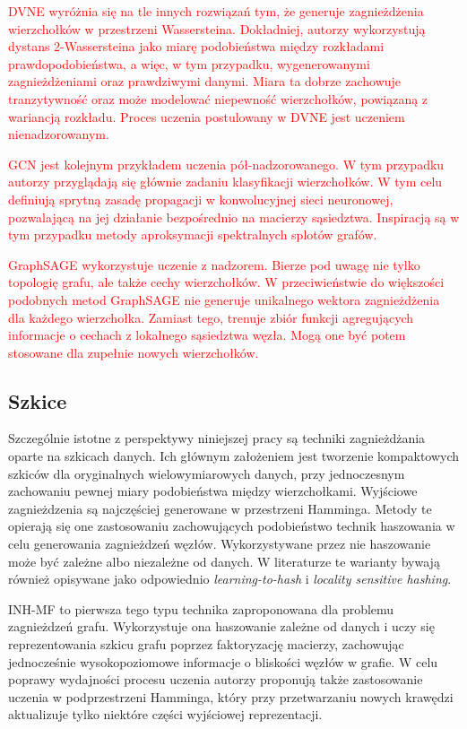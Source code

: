         \textcolor{red}{
        DVNE\cite{Zhu_Cui_Wang_Zhu_2018} wyróżnia się na tle innych rozwiązań tym, że generuje zagnieżdżenia wierzchołków w przestrzeni Wassersteina. Dokładniej, autorzy wykorzystują dystans 2-Wassersteina jako miarę podobieństwa między rozkładami prawdopodobieństwa, a więc, w tym przypadku, wygenerowanymi zagnieżdżeniami oraz prawdziwymi danymi. Miara ta dobrze zachowuje tranzytywność oraz może modelować niepewność wierzchołków, powiązaną z wariancją rozkładu. Proces uczenia postulowany w DVNE jest uczeniem nienadzorowanym.}
        
        \textcolor{red}{
        GCN\cite{DBLP:journals/corr/KipfW16} jest kolejnym przykładem uczenia pół-nadzorowanego. W tym przypadku autorzy przyglądają się głównie zadaniu klasyfikacji wierzchołków. W tym celu definiują sprytną zasadę propagacji w konwolucyjnej sieci neuronowej, pozwalającą na jej działanie bezpośrednio na macierzy sąsiedztwa. Inspiracją są w tym przypadku metody aproksymacji spektralnych splotów grafów.}
        
        \textcolor{red}{
        GraphSAGE\cite{DBLP:journals/corr/HamiltonYL17} wykorzystuje uczenie z nadzorem. Bierze pod uwagę nie tylko topologię grafu, ale także cechy wierzchołków. W przeciwieństwie do większości podobnych metod GraphSAGE nie generuje unikalnego wektora zagnieżdżenia dla każdego wierzchołka. Zamiast tego, trenuje zbiór funkcji agregujących informacje o cechach z lokalnego sąsiedztwa węzła. Mogą one być potem stosowane dla zupełnie nowych wierzchołków.}
        
    \subsection{Szkice}
        Szczególnie istotne z perspektywy niniejszej pracy są techniki zagnieżdżania oparte na szkicach danych. Ich głównym założeniem jest tworzenie kompaktowych szkiców dla oryginalnych wielowymiarowych danych, przy jednoczesnym zachowaniu pewnej miary podobieństwa między wierzchołkami. Wyjściowe zagnieżdzenia są najczęściej generowane w przestrzeni Hamminga. Metody te opierają się one zastosowaniu zachowujących podobieństwo technik haszowania w celu generowania zagnieżdzeń węzłów. Wykorzystywane przez nie haszowanie może być zależne albo niezależne od danych. W literaturze te warianty bywają również opisywane jako odpowiednio \emph{learning-to-hash} i \emph{locality sensitive hashing}\cite{wang2017survey}.  

        INH-MF\cite{Lian_Zheng_Zheng_Ge_Cao_Tsang_Xie_2018} to pierwsza tego typu technika zaproponowana dla problemu zagnieżdzeń grafu. Wykorzystuje ona haszowanie zależne od danych i uczy się reprezentowania szkicu grafu poprzez faktoryzację macierzy, zachowując jednocześnie wysokopoziomowe informacje o bliskości węzłów w grafie. W celu poprawy wydajności procesu uczenia autorzy proponują także zastosowanie uczenia w podprzestrzeni Hamminga, który przy przetwarzaniu nowych krawędzi aktualizuje tylko niektóre części wyjściowej reprezentacji.
        
